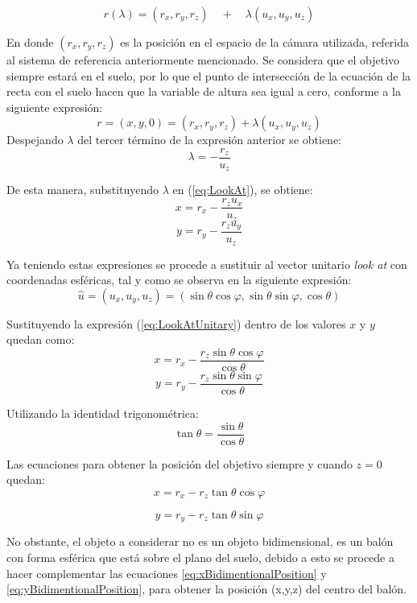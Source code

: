 \documentclass{book}
\begin{document}
\begin{equation}
\label{eq:LookAt}
r(\lambda) = (r_x, r_y, r_z)\quad +\quad \lambda (u_x, u_y, u_z)
\end{equation}


En donde $(r_x, r_y, r_z)$ es la posición en el espacio de la cámara utilizada, referida al sistema de referencia anteriormente mencionado. Se considera que el objetivo siempre estará en el suelo, por lo que el punto de intersección de la ecuación de la recta con el suelo hacen que la variable de altura sea igual a cero, conforme a la siguiente expresión:
\[r = (x, y, 0) = (r_x, r_y, r_z) + \lambda (u_x, u_y, u_z)\]
Despejando $\lambda$ del tercer término de la expresión anterior se obtiene:
\[\lambda = -\frac{r_z}{u_z}\]

De esta manera, substituyendo $\lambda$ en (\ref{eq:LookAt}), se obtiene:
\[x = r_x-\frac{r_z u_x}{u_z}\]
\[y = r_y-\frac{r_z u_y}{u_z}\]

Ya teniendo estas expresiones se procede a sustituir al vector unitario \textit{look at} con coordenadas esféricas, tal y como se observa en la siguiente expresión:
\begin{equation}
\label{eq:LookAtUnitary}
\hat{u}=(u_x, u_y, u_z)=(\sin{ \theta}\cos{\varphi},\sin{\theta}\sin{ \varphi},\cos{\theta})
\end{equation}

Sustituyendo la expresión (\ref{eq:LookAtUnitary}) dentro de los valores $x$ y $y$ quedan como:
\[x=r_x - \frac{r_z \sin{ \theta} \cos{\varphi}}{\cos{\theta}}\]
\[y=r_y - \frac{r_z \sin{\theta} \sin{ \varphi}}{\cos{\theta}}\]

Utilizando la identidad trigonométrica:
\[\tan{\theta} = \frac{\sin{\theta}}{\cos{\theta}}\]

Las ecuaciones para obtener la posición del objetivo siempre y cuando $z=0$ quedan:
\begin{equation}
\label{eq:xBidimentionalPosition}
x=r_x - r_z \tan{\theta}  \cos{\varphi}
\end{equation}

\begin{equation}
\label{eq:yBidimentionalPosition}
y=r_y - r_z \tan{\theta} \sin{\varphi}
\end{equation}

No obstante, el objeto a considerar no es un objeto bidimensional, es un balón con forma esférica que está sobre el plano del suelo, debido a esto se procede a hacer complementar las ecuaciones \ref{eq:xBidimentionalPosition} y \ref{eq:yBidimentionalPosition}, para obtener la posición (x,y,z) del centro del balón.
\end{document}
